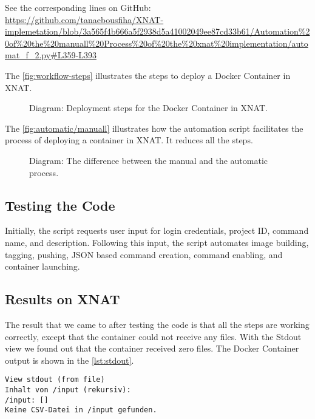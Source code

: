 \noindent\footnotesize See the corresponding lines on GitHub:\url{ https://github.com/tanaebousfiha/XNAT-implemetation/blob/3a565f4b666a5f2938d5a41002049ee87cd33b61/Automation%20of%20the%20manuall%20Process%20of%20the%20xnat%20implementation/automat_f_2.py#L359-L393}
\normalsize



The \autoref{fig:workflow-steps} illustrates the steps to deploy a Docker Container in XNAT.

\begin{figure}[H]
    \centering
    \def\svgwidth{0.7\linewidth}
    
    \caption{Diagram: Deployment steps for the Docker Container in XNAT.}
    \label{fig:workflow-steps}
\end{figure}


The \autoref{fig:automatic/manuall} illustrates how the automation script facilitates the process of deploying a container in XNAT. It reduces all the steps.

\begin{figure}[H]
    \centering
    \def\svgwidth{0.8\linewidth}
    
    \caption{Diagram: The difference between the manual and the automatic process.}
    \label{fig:automatic/manuall}
\end{figure}



\subsection{Testing the Code}
Initially, the script requests user input for login credentials, project ID, command name, and description. Following this input, the script automates image building, tagging, pushing, JSON based command creation, command enabling, and container launching.

\subsection{Results on XNAT}
The result that we came to after testing the code is that all the steps are working correctly, except that the container could not receive any files. With the \ac{Stdout} view we found out that the container received zero files. The Docker Container output is shown in the \autoref{lst:stdout}.
 
\begin{lstlisting}[numbers=none, caption={stdout in XNAT.}, label={lst:stdout}]
View stdout (from file)
Inhalt von /input (rekursiv):
/input: []
Keine CSV-Datei in /input gefunden.
\end{lstlisting}


